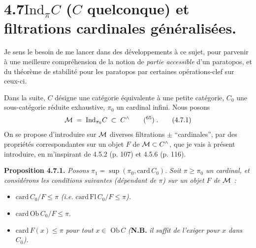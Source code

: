 \section*{4.7\quad $\mathrm{Ind}_{\pi}C$ ($C$ quelconque) et filtrations cardinales généralisées.}

Je sens le besoin de me lancer dans des développements à ce sujet, pour parvenir à une meilleure compréhension de la notion de \textit{partie accessible} d'un paratopos, et du théorème de stabilité pour les paratopos par certaines opérations-clef sur ceux-ci.

Dans la suite, $C$ désigne une catégorie équivalente à une petite catégorie, $C_0$ une sous-catégorie réduite exhaustive, $\pi_0$ un cardinal infini. Nous posons
\[
\Mc \;=\; \mathrm{Ind}_{\pi_0}C \;\subset\; C^{\wedge} \qquad \text{(\footnotemark[65])}\;. \tag*{(4.7.1)}
\]
On se propose d'introduire sur $\mathcal{M}$ diverses filtrations $\pm$ “cardinales”, par des propriétés correspondantes sur un objet $F$ de $\mathcal{M} \subset C^{\wedge}$, que je vais à présent introduire, en m'inspirant de 4.5.2 (p. 107) et 4.5.6 (p. 116).

\textbf{Proposition 4.7.1.} \textit{Posons} $\pi_1 = \sup(\pi_0, \mathrm{card}\, C_0)$. \textit{Soit $\pi \geqslant \pi_0$ un cardinal, et considérons les conditions suivantes (dépendant de $\pi$) sur un objet $F$ de $\mathcal{M}$ :}
\begin{itemize}[leftmargin=4em]
\item[\textit{a)}] $\mathrm{card}\, C_0/F \leqslant \pi$ \textit{(i.e.} $\mathrm{card}\,\mathrm{Fl}\, C_0/F \leqslant \pi$\textit{).}
\item[\textit{a$'$)}] $\mathrm{card}\,\mathrm{Ob}\, C_0/F \leqslant \pi$.
\item[\textit{a$''$)}] $\mathrm{card}\, F(x) \leqslant \pi$ \textit{pour tout $x \in$} $\mathrm{Ob}\, C$ \textit{(}\textbf{N.B.} \textit{il suffit de l'exiger pour $x$ dans $C_0$).}
\end{itemize}


